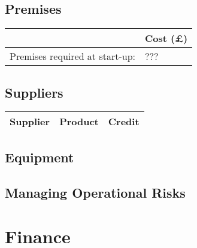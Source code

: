 \documentclass[DIV=calc, paper=a4, fontsize=11pt]{scrartcl}	 %
\begin{document}
\subsection{Premises}
\begin{tabular}{|l|l|} \hline
                               & Cost (\pounds) \\ \hline
Premises required at start-up: & ???            \\ \hline
\end{tabular}

\subsection{Suppliers}
\begin{tabular}{|l|l|l|} \hline
Supplier & Product & Credit \\ \hline
\end{tabular}

\subsection{Equipment}

\subsection{Managing Operational Risks}

\section{Finance}
\end{document}
